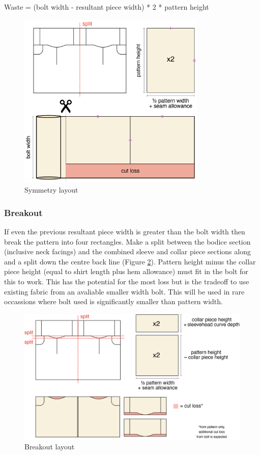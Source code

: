 Waste = (bolt width - resultant piece width) * 2 * pattern height
\begin{figure} [htb]
    \centering
    \includegraphics[width = 0.8\textwidth]{Images/symmetry layout.png}
    \caption{Symmetry layout}
    \label{fig:symmetry split}
\end{figure}

\subsubsection{Breakout}
If even the previous resultant piece width is greater than the bolt width then break the pattern into four rectangles. Make a split between the bodice section (inclusive neck facings) and the combined sleeve and collar piece sections along and a split down the centre back line (Figure \ref{fig:breakout}). Pattern height minus the collar piece height (equal to shirt length plus hem allowance) must fit in the bolt for this to work. This has the potential for the most loss but is the tradeoff to use existing fabric from an avaliable smaller width bolt. This will be used in rare occassions where bolt used is significantly smaller than pattern width.
\begin{figure} [htb]
    \centering
    \includegraphics[width = \textwidth]{Images/breakout.png}
    \caption{Breakout layout}
    \label{fig:breakout}
\end{figure}

